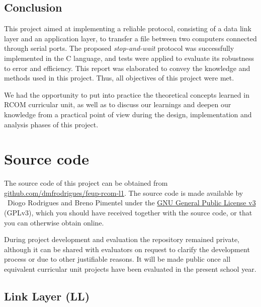 \documentclass[a4paper, 11pt]{report}
\begin{document}
\section{Conclusion} \label{sec:Conclusion}

This project aimed at implementing a reliable protocol, consisting of a data link layer and an application layer, to transfer a file between two computers connected through serial ports. The proposed \textit{stop-and-wait} protocol was successfully implemented in the C language, and tests were applied to evaluate its robustness to error and efficiency. This report was elaborated to convey the knowledge and methods used in this project.
Thus, all objectives of this project were met.

We had the opportunity to put into practice the theoretical concepts learned in RCOM curricular unit, as well as to discuss our learnings and deepen our knowledge from a practical point of view during the design, implementation and analysis phases of this project.

\appendix
\appendixpage
\addappheadtotoc
\chapter{Source code}

The source code of this project can be obtained from \href{https://github.com/dmfrodrigues/feup-rcom-l1}{github.com/dmfrodrigues/feup-rcom-l1}. The source code is made available by \textcopyright~Diogo Rodrigues and Breno Pimentel under the \href{https://www.gnu.org/licenses/gpl-3.0.en.html}{GNU General Public License v3} (GPLv3), which you should have received together with the source code, or that you can otherwise obtain online.

During project development and evaluation the repository remained private, although it can be shared with evaluators on request to clarify the development process or due to other justifiable reasons. It will be made public once all equivalent curricular unit projects have been evaluated in the present school year.

\fancyhfoffset[E,O]{0pt}

\section{Link Layer (LL)}


\end{document}
